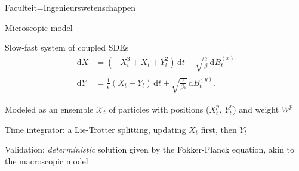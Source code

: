 \documentclass[landscape,a1paper,fontscale=0.45]{kuleuvenposter}
\newcommand{\dd}{\,\mathrm{d}}
\begin{document}
\begin{poster}{Faculteit=Ingenieurswetenschappen}
\begin{posterbox}[name=microscopic, column=0,below=micro-macro modelling]{Microscopic model}
\begin{noindentitemize}
\item Slow-fast system of coupled SDEs
\begin{align}
\dd X &= (-X_t^3 + X_t + Y_t^2) \dd t + \sqrt{\frac{2}{\beta}} \dd B_t^{(x)}  \label{eq:xParisdyn}\\
\dd Y &= \frac{1}{\epsilon}(X_t - Y_t) \dd t + \sqrt{\frac{2}{\beta\epsilon}} \dd B_t^{(y)}. \label{eq:yParisdyn}
\end{align}
%
\item Modeled as an ensemble $\mathcal{X}_t$ of particles with positions ($X_t^p$, $Y_t^p$) and weight $W^p$
\item Time integrator: a Lie-Trotter splitting, updating $X_t$ first, then $Y_t$
\item Validation: \emph{deterministic} solution given by the Fokker-Planck equation, akin to the macroscopic model
\end{noindentitemize}
\end{posterbox}


\end{poster}
\end{document}
